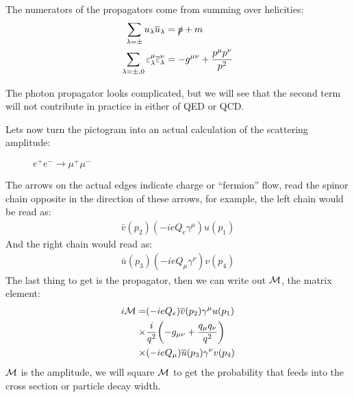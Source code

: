 The numerators of the propagators come from summing over helicities:
\begin{align*}
  \sum_{\lambda=\pm}u_\lambda\overline{u}_\lambda&=\slashed{p}+m\\
  \sum_{\lambda=\pm,0}\varepsilon^\mu_\lambda\overline{\varepsilon}^\nu_\lambda&=
  -g^{\mu\nu}+\frac{p^\mu p^\nu}{p^2}
\end{align*}

The photon propagator looks complicated, but we will see that the second term will not contribute in practice in either of QED or QCD.

Lets now turn the pictogram into an actual calculation of the scattering amplitude:
\begin{figure}[H]
  \centering
  \caption{$e^+e^-\to\mu^+\mu^-$}
  \label{fig:feynman}
\end{figure}
The arrows on the actual edges indicate charge or ``fermion'' flow, read the spinor chain opposite in the direction of these arrows, for example, the left chain would be read as:
\begin{align*}
  \bar{v}(p_2)(-ieQ_e\gamma^\mu)u(p_1)
\end{align*}
And the right chain would read as:
\begin{align*}
  \bar{u}(p_3)(-ieQ_\mu\gamma^\nu)v(p_4)
\end{align*}
The last thing to get is the propagator, then we can write out $\mathcal{M}$, the matrix element:
\begin{align*}
  i\mathcal{M}=&(-ieQ_e)\overline{v}(p_2)\gamma^\mu u(p_1)\\
  \times&\frac{i}{q^2}\qty(-g_{\mu\nu}+\frac{q_\mu q_\nu}{q^2})\\
  \times&(-ieQ_\mu)\overline{u}(p_3)\gamma^\nu v(p_4)
\end{align*}
$\mathcal{M}$ is the amplitude, we will square $\mathcal{M}$ to get the probability that feeds into the cross section or particle decay width.

